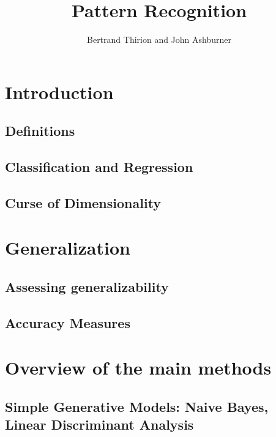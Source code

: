 \documentclass{beamer}
\title{Pattern Recognition}
\author{Bertrand Thirion and John Ashburner}
\date{}
\begin{document}
\begin{frame}
\titlepage
\end{frame}

\section{Introduction}
    \subsection{Definitions}                                                 
    \subsection{Classification and Regression}                               
    \subsection{Curse of Dimensionality}                                     
\section{Generalization}
    \subsection{Assessing generalizability}                                  
    \subsection{Accuracy Measures}                                           
\section{Overview of the main methods}

    \subsection{Simple Generative Models: Naive Bayes, Linear Discriminant Analysis}       
\end{document}
